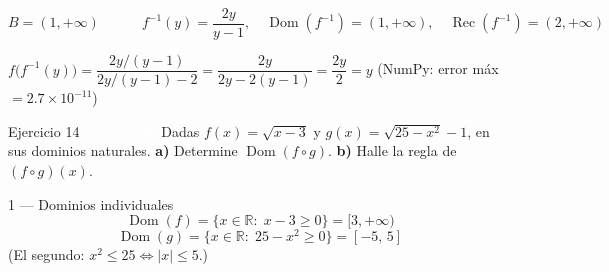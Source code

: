 \documentclass[letterpaper, 11pt]{article}
\begin{document}
\begin{resultado}
\[
    B=(1,+\infty)
    \qquad\quad
    f^{-1}(y)=\frac{2y}{y-1},\quad
    \operatorname{Dom}(f^{-1})=(1,+\infty),\quad
    \operatorname{Rec}(f^{-1})=(2,+\infty)
\]
\end{resultado}

\begin{verificacion}
$f\bigl(f^{-1}(y)\bigr)
= \dfrac{2y/(y-1)}{2y/(y-1)-2}
= \dfrac{2y}{2y-2(y-1)}
= \dfrac{2y}{2} = y$ \checkmark\quad
(NumPy: error máx $= 2.7\times10^{-11}$)
\end{verificacion}

\newpage

\begin{enunciado}{Ejercicio 14 \hfill \normalsize\textcolor{white}{[Nivel PEP]}}
Dadas $f(x)=\sqrt{x-3}$ y $g(x)=\sqrt{25-x^2}-1$, en sus dominios naturales.
\textbf{a)} Determine $\operatorname{Dom}(f\circ g)$.
\textbf{b)} Halle la regla de $(f\circ g)(x)$.
\end{enunciado}

\begin{paso}{1 — Dominios individuales}
\[
    \operatorname{Dom}(f) = \{x\in\mathbb{R}:\; x-3\geq 0\}
                          = [3,+\infty)
\]
\[
    \operatorname{Dom}(g) = \{x\in\mathbb{R}:\; 25-x^2\geq 0\}
                          = [-5,\,5]
\]
(El segundo: $x^2\leq 25 \Leftrightarrow |x|\leq 5$.)
\end{paso}
\end{document}
